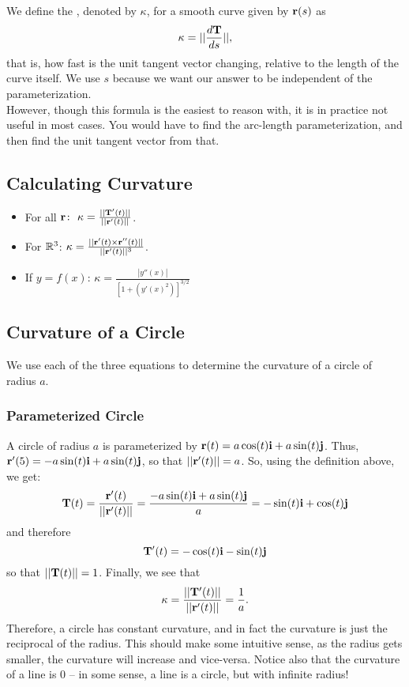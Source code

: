 We define the , denoted by \(\kappa\), for a smooth curve given by \(\mathbf{r}(s)\) as 
\[
    \kappa = ||\frac{d\mathbf{T}}{ds}||,
\]
that is, how fast is the unit tangent vector changing, relative to the length of the curve itself. We use \(s\) because we want our answer to be independent of the parameterization. \\

However, though this formula is the easiest to reason with, it is in practice not useful in most cases. You would have to find the arc-length parameterization, and then find the unit tangent vector from that.  

\subsection{Calculating Curvature}

\begin{itemize}
    \item For all \(\mathbf{r} \colon \ \kappa = \frac{||\mathbf{T}'(t)||}{||\mathbf{r}'(t)||}\).
    \item For \(\mathbb{R}^{3}\): \(\kappa = \frac{||\mathbf{r}'(t) \times \mathbf{r}''(t)||}{||\mathbf{r}'(t)||^{3}}\).
    \item If \(y = f(x)\): \(\kappa = \frac{|y''(x)|}{[1 + (y'(x)^{2})]^{3/2}}\)
\end{itemize}

\subsection{Curvature of a Circle}

We use each of the three equations to determine the curvature of a circle of radius \(a\).

\subsubsection{Parameterized Circle}

A circle of radius \(a\) is parameterized by \(\mathbf{r}(t) = a \cos(t)\mathbf{i} + a \sin(t)\mathbf{j}\). Thus, \(\mathbf{r}'(5) = -a \sin(t)\mathbf{i} + a \sin(t)\mathbf{j}\), so that \(||\mathbf{r}'(t)|| = a\). So, using the definition above, we get:
\[
    \mathbf{T}(t) = \frac{\mathbf{r}'(t)}{||\mathbf{r}'(t)||} = \frac{-a \sin(t)\mathbf{i} + a \sin(t)\mathbf{j}}{a} = -\sin(t)\mathbf{i} + \cos(t)\mathbf{j}
\]
and therefore
\[
    \mathbf{T}'(t) = -\cos(t)\mathbf{i} - \sin(t)\mathbf{j}
\]
so that \(||\mathbf{T}(t)|| = 1\). Finally, we see that 
\[
    \kappa = \frac{||\mathbf{T}'(t)||}{||\mathbf{r}'(t)||} = \frac{1}{a}.
\]
Therefore, a circle has constant curvature, and in fact the curvature is just the reciprocal of the radius. This should make some intuitive sense, as the radius gets smaller, the curvature will increase and vice-versa. Notice also that the curvature of a line is 0 -- in some sense, a line is a circle, but with infinite radius!

